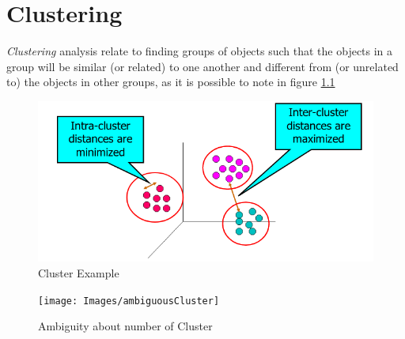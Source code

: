 \chapter{Clustering}
\emph{Clustering} analysis relate to finding groups of objects such that the objects in a group will be similar (or related) to one another 
and different from (or unrelated to) the objects in other groups, as it is possible to note in figure \ref{img:cluster}

\begin{figure}
    \caption{Cluster Example}
    \label{img:cluster}
    \includegraphics[width=\textwidth]{Images/cluster}
\end{figure}

\begin{figure}
    \caption{Ambiguity about number of Cluster}
    \label{img:ambiguousCluster}
    \texttt{[image: Images/ambiguousCluster]}
\end{figure}

